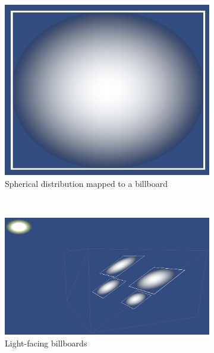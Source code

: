 \begin{figure}[t]
\centering
	\begin{subfigure}[t]{0.48\textwidth}
	\includegraphics[width=\textwidth]{../res/spherebillboard.png}
	\caption{Spherical distribution mapped to a billboard}
	\end{subfigure}
	~
	\begin{subfigure}[t]{0.48\textwidth}
	\includegraphics[width=\textwidth]{../res/lightfacing.png}
	\caption{Light-facing billboards}
	\end{subfigure}
	~
	\begin{subfigure}[t]{0.48\textwidth}

\end{subfigure}
\end{figure}
